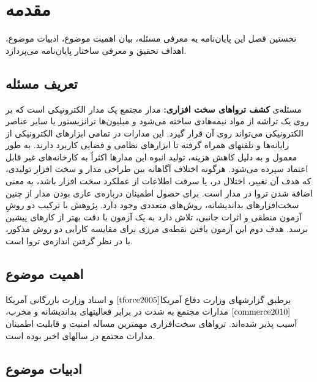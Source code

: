 \chapter{مقدمه}

نخستین فصل این پایان‌نامه به معرفی مسئله، بیان اهمیت موضوع، ادبیات موضوع،
اهداف تحقیق و معرفی ساختار پایان‌نامه می‌پردازد.



\section{تعریف مسئله }

مسئله‌ی \textbf{کشف ترواهای سخت افزاری: }
مدار مجتمع یک مدار الکترونیکی است که بر روی یک تراشه از مواد نیمه‌ها‌‌دی ساخته می‌شود و میلیون‌ها ترانزیستور یا سایر عناصر الکترونیکی می‌تواند روی آن قرار گیرد. این مدارات در تمامی ابزارهای الکترونیکی از رایانه‌ها‌‌ و تلفنهای همراه گرفته تا ابزارهای نظامی و فضایی کاربرد دارند. به طور معمول و به دلیل کاهش هزینه، تولید انبوه این مدارها اکثراً به کارخانه‌های غیر قابل اعتماد سپرده می‌شود. هرگونه اختلاف آگاهانه بین طراحی مدار و سخت افزار تولیدی، که هدف آن تغییر، اختلال در، یا سرقت اطلاعات از عملکرد سخت افزار باشد، به معنی اضافه شدن تروا در مدار است. برای حصول اطمینان درباره‌ی عاری بودن مدار از چنین سخت‌افزارهای بداندیشانه، روش‌های متعددی وجود دارد.  پژوهش با ترکیب دو روشِ آزمون منطقی و اثرات جانبی‌‌، تلاش دارد به یک آزمون با دقت بهتر از کارهای پیشین برسد. هدف دوم این آزمون یافتن نقطه‌ی مرزی برای مقایسه کارایی دو روش مذکور، با در نظر گرفتن اندازه‌ی تروا است.

\section{اهمیت موضوع}

برطبق گزارشهای وزارت دفاع آمریکا$ {\cite{tforce2005}}$
و اسناد وزارت بازرگانی آمریکا $\cite{commerce2010}$ مدارات مجتمع به شدت در برابر فعالیتهای بداندیشانه و مخرب، آسیب پذیر شده‌اند. تروا‌های سخت‌افزاری مهمترین مساله امنیت و قابلیت اطمینان مدارات مجتمع در سالهای اخیر بوده است.


\section{ادبیات موضوع}

